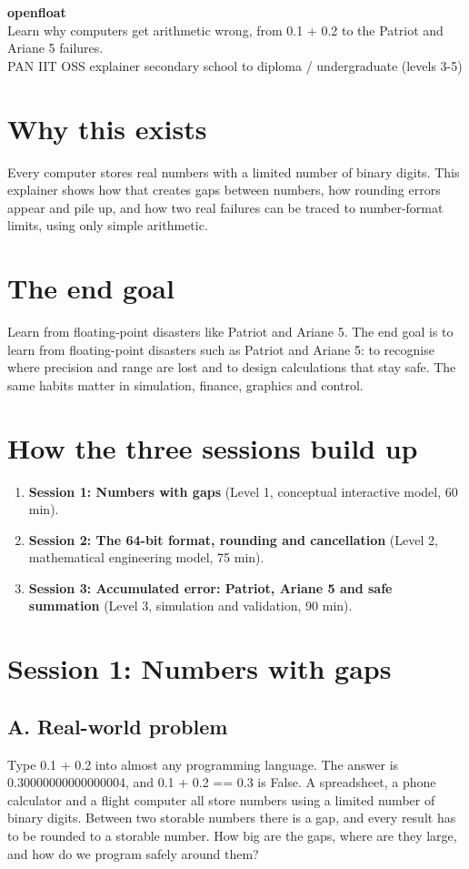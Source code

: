 \documentclass[11pt,a4paper]{article}
\begin{document}
\begin{center}{\LARGE\bfseries openfloat}\\[0.4em]{\large Learn why computers get arithmetic wrong, from 0.1 + 0.2 to the Patriot and Ariane 5 failures.}\\[0.2em]\small PAN IIT OSS explainer \textbullet{} secondary school to diploma / undergraduate (levels 3-5)\end{center}

\section*{Why this exists}
Every computer stores real numbers with a limited number of binary digits. This explainer shows how that creates gaps between numbers, how rounding errors appear and pile up, and how two real failures can be traced to number-format limits, using only simple arithmetic.

\section*{The end goal}
Learn from floating-point disasters like Patriot and Ariane 5. The end goal is to learn from floating-point disasters such as Patriot and Ariane 5: to recognise where precision and range are lost and to design calculations that stay safe. The same habits matter in simulation, finance, graphics and control.

\section*{How the three sessions build up}
\begin{enumerate}[nosep]
\item \textbf{Session 1: Numbers with gaps} (Level 1, conceptual interactive model, 60 min).
\item \textbf{Session 2: The 64-bit format, rounding and cancellation} (Level 2, mathematical engineering model, 75 min).
\item \textbf{Session 3: Accumulated error: Patriot, Ariane 5 and safe summation} (Level 3, simulation and validation, 90 min).
\end{enumerate}

\section{Session 1: Numbers with gaps}

\subsection*{A. Real-world problem}
Type 0.1 + 0.2 into almost any programming language. The answer is 0.30000000000000004, and 0.1 + 0.2 == 0.3 is False. A spreadsheet, a phone calculator and a flight computer all store numbers using a limited number of binary digits. Between two storable numbers there is a gap, and every result has to be rounded to a storable number. How big are the gaps, where are they large, and how do we program safely around them?
\end{document}
